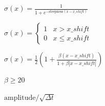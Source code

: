 \documentclass{article}
\begin{document}
$ \sigma(x) = \frac{1}{1 + e^{-\mathrm{steepness}(x - x\_shift)}} $
\pagebreak

$ \sigma(x) = \begin{cases} 1 & x > x\_shift \\ 0 & x \le x\_shift \end{cases} $
\pagebreak

$ \sigma(x) = \frac{1}{2}\left(1 + \frac{\beta(x - x\_shift)}{1 + \beta|x - x\_shift|}\right) $
\pagebreak

$\beta \ge 20$
\pagebreak

$ \text{amplitude} / \sqrt{\Delta t} $
\pagebreak
\end{document}
